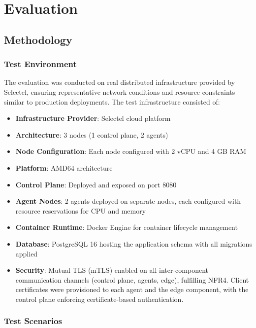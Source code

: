 \chapter{Evaluation}
\label{chap:eval}

\section{Methodology}

\subsection{Test Environment}

The evaluation was conducted on real distributed infrastructure provided by Selectel, ensuring representative network conditions and resource constraints similar to production deployments. The test infrastructure consisted of:

\begin{itemize}
\item \textbf{Infrastructure Provider}: Selectel cloud platform
\item \textbf{Architecture}: 3 nodes (1 control plane, 2 agents)
\item \textbf{Node Configuration}: Each node configured with 2 vCPU and 4 GB RAM
\item \textbf{Platform}: AMD64 architecture
\item \textbf{Control Plane}: Deployed and exposed on port 8080
\item \textbf{Agent Nodes}: 2 agents deployed on separate nodes, each configured with resource reservations for CPU and memory
\item \textbf{Container Runtime}: Docker Engine for container lifecycle management
\item \textbf{Database}: PostgreSQL 16 hosting the application schema with all migrations applied
\item \textbf{Security}: Mutual TLS (mTLS) enabled on all inter-component communication channels (control plane, agents, edge), fulfilling NFR4. Client certificates were provisioned to each agent and the edge component, with the control plane enforcing certificate-based authentication.
\end{itemize}

\subsection{Test Scenarios}

